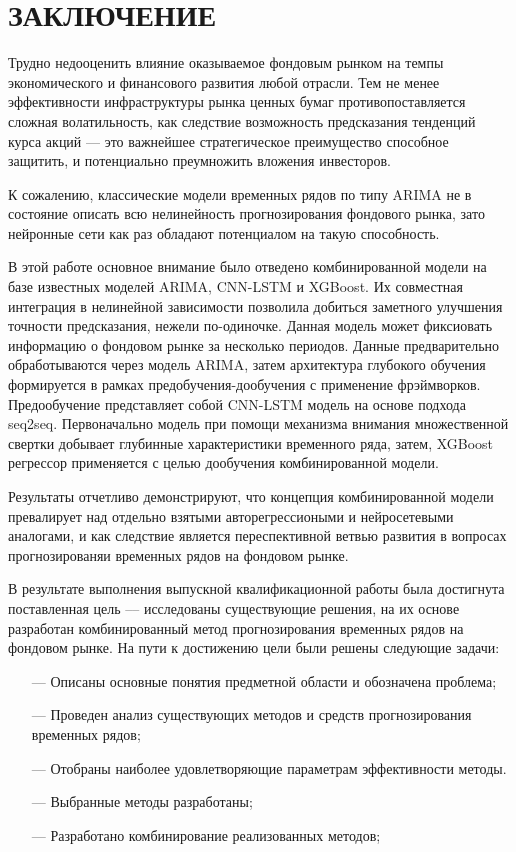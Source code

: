 \section*{ЗАКЛЮЧЕНИЕ}

\par Трудно недооценить влияние оказываемое фондовым рынком на темпы экономического и финансового развития любой отрасли. Тем не менее эффективности инфраструктуры рынка ценных бумаг противопоставляется сложная волатильность, как следствие возможность предсказания тенденций курса акций --- это важнейшее стратегическое преимущество способное защитить, и потенциально преумножить вложения инвесторов. 
\par К сожалению, классические модели временных рядов по типу ARIMA не в состояние описать всю нелинейность прогнозирования фондового рынка, зато нейронные сети как раз обладают потенциалом на такую способность. 
\par В этой работе основное внимание было отведено комбинированной модели на базе известных моделей ARIMA, CNN-LSTM и XGBoost. Их совместная интеграция в нелинейной зависимости позволила добиться заметного улучшения точности предсказания, нежели по-одиночке. Данная модель может фиксиовать информацию о фондовом рынке за несколько периодов. Данные  предварительно обработываются через модель ARIMA, затем архитектура глубокого обучения формируется в рамках предобучения-дообучения с применение фрэймворков. Предообучение представляет собой CNN-LSTM модель на основе подхода seq2seq. Первоначально модель при помощи механизма внимания множественной свертки добывает глубинные характеристики временного ряда, затем, XGBoost регрессор применяется с целью дообучения комбинированной модели. 
\par Результаты отчетливо демонстрируют, что концепция комбинированной модели превалирует над отдельно взятыми авторегрессиоными и нейросетевыми аналогами, и как следствие является переспективной ветвью развития в вопросах прогнозированяи временных рядов на фондовом рынке.

\par В результате выполнения выпускной квалификационной работы была достигнута поставленная цель –-- исследованы существующие решения, на их основе разработан комбинированный метод прогнозирования временных рядов на фондовом рынке. На пути к достижению цели были решены следующие задачи:
\begin{itemize}[leftmargin=1.6\parindent]
    \item[---] Описаны основные понятия предметной области и обозначена проблема;
	\item[---] Проведен анализ существующих методов и средств прогнозирования временных рядов;
	\item[---] Отобраны наиболее удовлетворяющие параметрам эффективности методы.
	\item[---] Выбранные методы разработаны;
	\item[---] Разработано комбинирование реализованных методов;
\end{itemize}

\pagebreak



\pagebreak